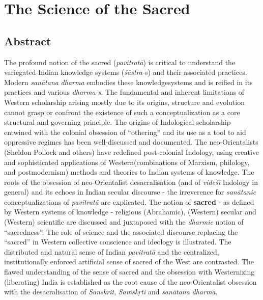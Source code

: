 
\chapter{The Science of the Sacred}



\section*{Abstract}

The profound notion of the sacred (\textit{pavitratā}) is critical to understand the variegated Indian knowledge systems (\textit{śāstra-}s) and their associated practices. Modern \textit{sanātana} \textit{dharma }embodies these knowledge\break systems and is reified in its practices and various \textit{dharma-s}. The fundamental and inherent limitations of Western scholarship arising mostly due to its origins, structure and evolution cannot grasp or confront the existence of such a conceptualization as a core structural and governing principle. The origins of Indological scholarship entwined with the colonial obsession of “othering” and its use as a tool to aid oppressive regimes has been well-discussed and documented. The neo-Orientalists (Sheldon Pollock and others) have redefined post-colonial Indology, using creative and sophisticated applications of Western\break (combinations of Marxism, philology, and postmodernism) methods and theories to Indian systems of knowledge. The roots of the obsession of neo-Orientalist desacralisation (and of \textit{videśī} Indology in general) and its echoes in Indian secular discourse - the irreverence for \textit{sanātanic} conceptualizations of \textit{pavitratā} are explicated. The notion of \textbf{sacred} - as defined by Western systems of knowledge - religious (Abrahamic), (Western) secular and (Western) scientific are discussed and juxtaposed with the \textit{dharmic} notion of “sacredness”. The role of science and the associated discourse replacing the “sacred” in Western collective conscience and ideology is illustrated. The distributed and natural sense of Indian \textit{pavitratā }and the centralized, institutionally enforced artificial sense of sacred of the West are contrasted. The flawed understanding of the sense of sacred and the obsession with Westernizing (liberating) India is established as the root cause of the neo-Orientalist obsession with the desacralisation of \textit{Sanskrit}, \textit{Saṁskṛti} and \textit{sanātana} \textit{dharma}.


